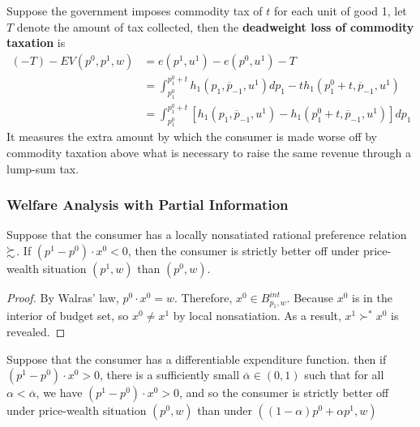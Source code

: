 \documentclass{report}
\begin{document}
 			\begin{definition}
 				Suppose the government imposes commodity tax of $t$ for each unit of good 1, let $T$ denote the amount of tax collected, then the \textbf{deadweight loss of commodity taxation} is 
 				\begin{align}
 					(-T)-E V\left(p^{0}, p^{1}, w\right) &=e\left(p^{1}, u^{1}\right)-e\left(p^{0}, u^{1}\right)-T \\
 					&=\int_{p_{1}^{0}}^{p_{1}^{0}+t} h_{1}\left(p_{1}, \overline{p}_{-1}, u^{1}\right) d p_{1}-t h_{1}\left(p_{1}^{0}+t, \overline{p}_{-1}, u^{1}\right) \\
 					&=\int_{p_{1}^{0}}^{p_{1}^{0}+t}\left[h_{1}\left(p_{1}, \overline{p}_{-1}, u^{1}\right)-h_{1}\left(p_{1}^{0}+t, \overline{p}_{-1}, u^{1}\right)\right] d p_{1}
 				\end{align}
 				It measures the extra amount by which the consumer is made worse off by commodity taxation above what is necessary to raise the same revenue through a lump-sum tax.
 			\end{definition}
 			
 			\subsubsection{Welfare Analysis with Partial Information}
 			
 			\begin{proposition}[3.I.1]
 				Suppose that the consumer has a locally nonsatiated rational preference relation $\succsim$. If $(p^1-p^0) \cdot x^0 < 0$, then the consumer is strictly better off under price-wealth situation $(p^1, w)$ than $(p^0, w)$.
 			\end{proposition}
 			
 			\begin{proof}
 				By Walras' law, $p^0 \cdot x^0 = w$. Therefore, $x^0 \in B_{p_1, w}^{int}$. Because $x^0$ is in the interior of budget set, so $x^0 \neq x^1$ by local nonsatiation. As a result, $x^1 \succ^* x^0$ is revealed.
 			\end{proof}
 			
 			\begin{proposition}[3.I.2]
 				Suppose that the consumer has a differentiable expenditure function. then if $\left(p^{1}-p^{0}\right) \cdot x^{0}>0$, there is a sufficiently small $\overline{\alpha} \in (0, 1)$ such that for all $\alpha < \overline{\alpha}$, we have $\left(p^{1}-p^{0}\right) \cdot x^{0}>0$, and so the consumer is strictly better off under price-wealth situation $(p^0, w)$ than under $\left((1-\alpha) p^{0}+\alpha p^{1}, w\right)$
 			\end{proposition}
 			
\end{document}
